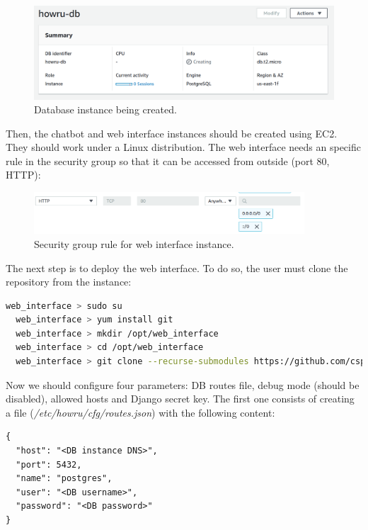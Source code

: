 \documentclass[12pt,english]{article}
\begin{document}
\begin{figure}[H]
  \centering
  \includegraphics[width=\textwidth]{db_creation.png}
  \caption{Database instance being created.}
\end{figure}

Then, the chatbot and web interface instances should be created using EC2. They should work under a Linux distribution. The web interface needs an specific rule in the security group so that it can be accessed from outside (port 80, HTTP):

\begin{figure}[H]
  \centering
  \includegraphics[width=0.9\textwidth]{web_int_sg.png}
  \caption{Security group rule for web interface instance.}
\end{figure}

The next step is to deploy the web interface. To do so, the user must clone the repository from the instance:

\begin{lstlisting}[mathescape=false, language=bash, caption={Commands to download the web interface repository}, captionpos=b]
  web_interface > sudo su
  web_interface > yum install git
  web_interface > mkdir /opt/web_interface
  web_interface > cd /opt/web_interface
  web_interface > git clone --recurse-submodules https://github.com/csp98/howru_web_interface.git .
\end{lstlisting}

Now we should configure four parameters: DB routes file, debug mode (should be disabled), allowed hosts and Django secret key. The first one consists of creating a file (\emph{/etc/howru/cfg/routes.json}) with the following content:

\begin{lstlisting}[caption={Routes file}, captionpos=b]
{
  "host": "<DB instance DNS>",
  "port": 5432,
  "name": "postgres",
  "user": "<DB username>",
  "password": "<DB password>"
}
\end{lstlisting}
\end{document}
